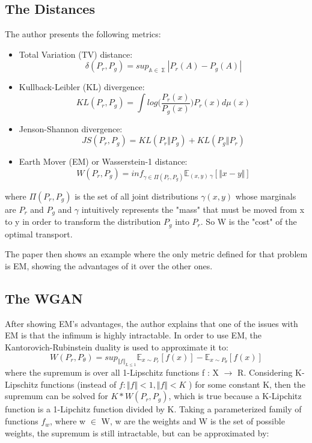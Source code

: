 \subsection{The Distances}
The author presents the following metrics:
\begin{itemize}
	\item Total Variation (TV) distance:
	\begin{equation}
		\delta(P_{r}, P_{g}) = sup_{\mathbb{A \in \sum}}|P_{r}(A)-P_{g}(A)| 
	\end{equation}
	\item Kullback-Leibler (KL) divergence:
	\begin{equation}
		KL(P_{r}, P_{g}) = \int log \Big(\frac{P_{r}(x)}{P_{g}(x)}\Big) P_{r}(x) d\mu(x) 
	\end{equation}
	\item Jenson-Shannon divergence:
	\begin{equation}
		JS(P_{r}, P_{g}) = KL(P_{r} \Vert P_{g}) + KL(P_{g} \Vert P_{r}) 
	\end{equation}
	\item Earth Mover (EM) or Wasserstein-1 distance:
	\begin{equation}
		W(P_{r}, P_{g}) = inf_{\gamma \in \Pi(P_{r},P_{g})} \mathbb{E}_{(x,y)~\gamma}[\Vert x - y \Vert]
	\end{equation}	
\end{itemize}

where $\Pi(P_{r}, P_{g})$ is the set of all joint distributions $\gamma(x,y)$ whose marginals are $P_{r}$ and $P_{g}$ and $\gamma$ intuitively represents the "mass" that must be moved from x to y in order to transform the distribution  $P_{g}$ into $P_{r}$. So W is the "cost" of the optimal transport.

The paper then shows an example where the only metric defined for that problem is EM, showing the advantages of it over the other ones.
\subsection{The WGAN}
After showing EM's advantages, the author explains that one of the issues with EM is that the infimum is highly intractable. In order to use EM, the Kantorovich-Rubinstein duality is used to approximate it to:
\begin{equation}
	W(P_{r},P_{\theta}) = sup_{\Vert f \Vert_{L \leq 1}} \mathbb{E}_{x \sim P_{r}}[f(x)] - \mathbb{E}_{x \sim P_{\theta}}[f(x)]
\end{equation}
where the supremum is over all 1-Lipschitz functions f : X $\rightarrow$ R. Considering K-Lipschitz functions (instead of $f : \Vert f \Vert < 1, \Vert f \Vert < K$ ) for some constant K, then the supremum can be solved  for $K*W(P_{r}, P_{g})$, which is true because a K-Lipchitz function is a 1-Lipchitz function divided by K. Taking a parameterized family of  functions $f_{w}$, where w $\in$ W, w are the weights and W is the set of possible weights,  the supremum is still intractable, but can be approximated by:

